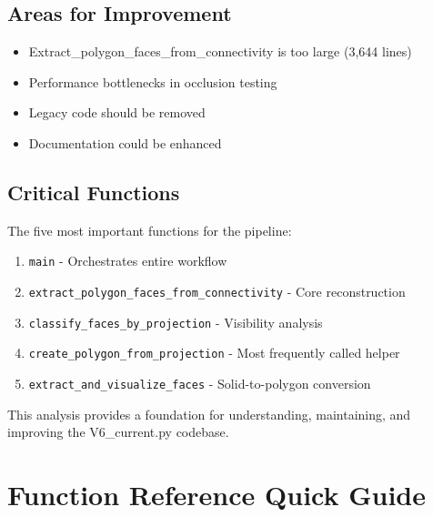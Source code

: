 \documentclass[11pt,a4paper]{article}
\begin{document}
\subsection{Areas for Improvement}
\begin{itemize}
    \item Extract\_polygon\_faces\_from\_connectivity is too large (3,644 lines)
    \item Performance bottlenecks in occlusion testing
    \item Legacy code should be removed
    \item Documentation could be enhanced
\end{itemize}

\subsection{Critical Functions}
The five most important functions for the pipeline:
\begin{enumerate}
    \item \texttt{main} - Orchestrates entire workflow
    \item \texttt{extract\_polygon\_faces\_from\_connectivity} - Core reconstruction
    \item \texttt{classify\_faces\_by\_projection} - Visibility analysis
    \item \texttt{create\_polygon\_from\_projection} - Most frequently called helper
    \item \texttt{extract\_and\_visualize\_faces} - Solid-to-polygon conversion
\end{enumerate}

This analysis provides a foundation for understanding, maintaining, and improving the V6\_current.py codebase.

\appendix
\section{Function Reference Quick Guide}
\end{document}
